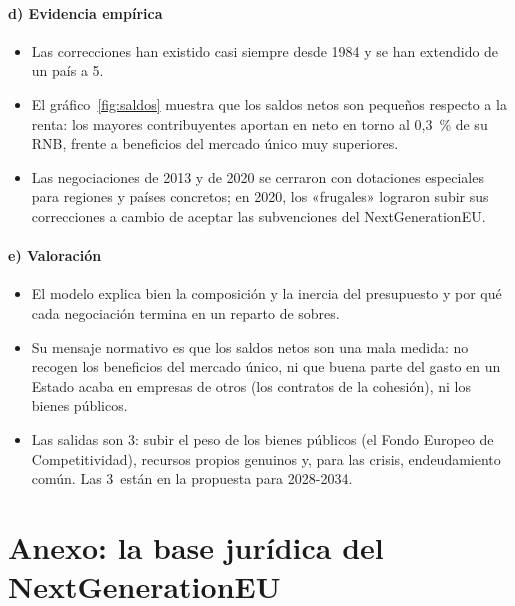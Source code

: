 \documentclass[11pt]{article}
\begin{document}
\paragraph{d) Evidencia empírica}

\begin{itemize}
\item Las correcciones han existido casi siempre desde 1984 y se han extendido de un país a 5.
\item El gráfico~\ref{fig:saldos} muestra que los saldos netos son pequeños respecto a la renta: los mayores contribuyentes aportan en neto en torno al 0,3~\% de su RNB, frente a beneficios del mercado único muy superiores.
\item Las negociaciones de 2013 y de 2020 se cerraron con dotaciones especiales para regiones y países concretos; en 2020, los «frugales» lograron subir sus correcciones a cambio de aceptar las subvenciones del NextGenerationEU\nocite{ConsejoEuropeo2020Conclusiones}.
\end{itemize}

\paragraph{e) Valoración}

\begin{itemize}
\item El modelo explica bien la composición y la inercia del presupuesto y por qué cada negociación termina en un reparto de sobres.
\item Su mensaje normativo es que los saldos netos son una mala medida: no recogen los beneficios del mercado único, ni que buena parte del gasto en un Estado acaba en empresas de otros (los contratos de la cohesión), ni los bienes públicos.
\item Las salidas son 3: subir el peso de los bienes públicos (el Fondo Europeo de Competitividad), recursos propios genuinos y, para las crisis, endeudamiento común. Las 3~están en la propuesta para 2028-2034.
\end{itemize}

\section{Anexo: la base jurídica del NextGenerationEU}\label{anexo:juridico}
\end{document}
